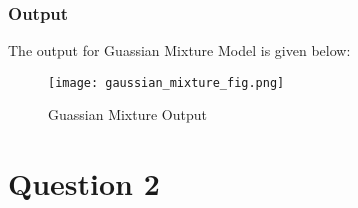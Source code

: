 \documentclass[12pt,letterpaper]{article}
\begin{document}
\subsubsection*{Output}
The output for Guassian Mixture Model is given below:
\begin{figure}[H]  %
    \centering
    \texttt{[image: gaussian\_mixture\_fig.png]}
    \caption{Guassian Mixture Output}
    \label{Fig:2}
\end{figure}

\vspace{-0.2in}  %
\pagebreak
\section*{Question 2}
\end{document}

